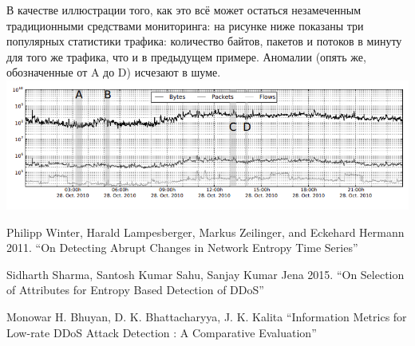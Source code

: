 \documentclass[]{interact}
\theoremstyle{plain}%
\theoremstyle{definition}
\theoremstyle{remark}
\begin{document}
В качестве иллюстрации того, как это всё может остаться незамеченным традиционными средствами мониторинга: на рисунке ниже показаны три популярных
статистики трафика: количество байтов, пакетов и потоков в минуту для того же трафика, что и в предыдущем примере. Аномалии (опять же, обозначенные от A до D) исчезают в шуме.
\includegraphics[scale=0.5]{./img3.png}


\begin{thebibliography}{}

Philipp Winter, Harald Lampesberger,
Markus Zeilinger, and Eckehard Hermann 2011. ``On Detecting Abrupt Changes
in Network Entropy Time Series''

Sidharth Sharma, Santosh Kumar Sahu,  Sanjay Kumar Jena 2015. ``On Selection of Attributes for Entropy Based
Detection of DDoS''

Monowar H. Bhuyan, D. K. Bhattacharyya, J. K. Kalita ``Information Metrics for Low-rate DDoS Attack
Detection : A Comparative Evaluation''


\end{thebibliography}
\end{document}
